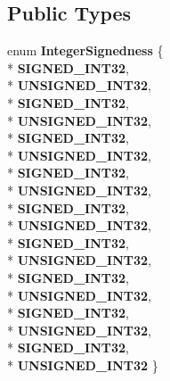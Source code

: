 \subsection*{Public Types}
\begin{DoxyCompactItemize}
\item 
enum {\bfseries Integer\+Signedness} \{ \\*
{\bfseries S\+I\+G\+N\+E\+D\+\_\+\+I\+N\+T32}, 
\\*
{\bfseries U\+N\+S\+I\+G\+N\+E\+D\+\_\+\+I\+N\+T32}, 
\\*
{\bfseries S\+I\+G\+N\+E\+D\+\_\+\+I\+N\+T32}, 
\\*
{\bfseries U\+N\+S\+I\+G\+N\+E\+D\+\_\+\+I\+N\+T32}, 
\\*
{\bfseries S\+I\+G\+N\+E\+D\+\_\+\+I\+N\+T32}, 
\\*
{\bfseries U\+N\+S\+I\+G\+N\+E\+D\+\_\+\+I\+N\+T32}, 
\\*
{\bfseries S\+I\+G\+N\+E\+D\+\_\+\+I\+N\+T32}, 
\\*
{\bfseries U\+N\+S\+I\+G\+N\+E\+D\+\_\+\+I\+N\+T32}, 
\\*
{\bfseries S\+I\+G\+N\+E\+D\+\_\+\+I\+N\+T32}, 
\\*
{\bfseries U\+N\+S\+I\+G\+N\+E\+D\+\_\+\+I\+N\+T32}, 
\\*
{\bfseries S\+I\+G\+N\+E\+D\+\_\+\+I\+N\+T32}, 
\\*
{\bfseries U\+N\+S\+I\+G\+N\+E\+D\+\_\+\+I\+N\+T32}, 
\\*
{\bfseries S\+I\+G\+N\+E\+D\+\_\+\+I\+N\+T32}, 
\\*
{\bfseries U\+N\+S\+I\+G\+N\+E\+D\+\_\+\+I\+N\+T32}, 
\\*
{\bfseries S\+I\+G\+N\+E\+D\+\_\+\+I\+N\+T32}, 
\\*
{\bfseries U\+N\+S\+I\+G\+N\+E\+D\+\_\+\+I\+N\+T32}, 
\\*
{\bfseries S\+I\+G\+N\+E\+D\+\_\+\+I\+N\+T32}, 
\\*
{\bfseries U\+N\+S\+I\+G\+N\+E\+D\+\_\+\+I\+N\+T32}
 \}\hypertarget{classv8_1_1internal_1_1_l_code_gen_a29a982d57fb7548092bffc62539543b6}{}\label{classv8_1_1internal_1_1_l_code_gen_a29a982d57fb7548092bffc62539543b6}


\end{DoxyCompactItemize}
